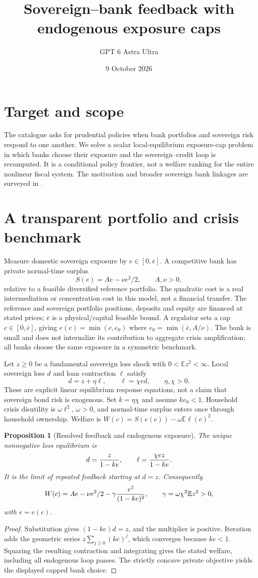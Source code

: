 \documentclass[11pt]{article}
\title{Sovereign--bank feedback with endogenous exposure caps}
\author{GPT 6 Astra Ultra}
\date{9 October 2026}
\newtheorem{proposition}[theorem]{Proposition}
\theoremstyle{definition}
\begin{document}
\maketitle
\section*{Target and scope}
The catalogue asks for prudential policies when bank portfolios and sovereign
risk respond to one another. We solve a scalar local-equilibrium exposure-cap
problem in which banks choose their exposure and the sovereign--credit loop
is recomputed. It is a conditional policy frontier, not a welfare ranking
for the entire nonlinear fiscal system. The motivation and broader sovereign
bank linkages are surveyed in \cite{mt}.

\section*{A transparent portfolio and crisis benchmark}
Measure domestic sovereign exposure by $e\in[0,\bar e]$. A competitive bank
has private normal-time surplus
\[
 S(e)=Ae-\nu e^2/2,\qquad A,\nu>0,
\]
relative to a feasible diversified reference portfolio. The quadratic cost
is a real intermediation or concentration cost in this model, not a financial
transfer. The reference and sovereign portfolio positions, deposits and
equity are financed at stated prices; $\bar e$ is a physical/capital feasible
bound. A regulator sets a cap $c\in[0,\bar e]$, giving
$e(c)=\min(c,e_0)$ where $e_0=\min(\bar e,A/\nu)$.
The bank is small and does not internalize its contribution to aggregate
crisis amplification; all banks choose the same exposure in a symmetric
benchmark.

Let $z\ge0$ be a fundamental sovereign loss shock with
$0<\mathbb E z^2<\infty$. Local sovereign loss $d$ and loan contraction
$\ell$ satisfy
\[
 d=z+\eta\ell,\qquad \ell=\chi e d,\qquad\eta,\chi>0.
\]
These are explicit linear equilibrium response equations, not a claim that
sovereign bond risk is exogenous. Set $k=\eta\chi$ and assume
$ke_0<1$. Household crisis disutility is $\omega\ell^2$, $\omega>0$,
and normal-time surplus enters once through household ownership. Welfare is
$W(c)=S(e(c))-\omega\mathbb E\ell(c)^2$.

\begin{proposition}[Resolved feedback and endogenous exposure]
The unique nonnegative loss equilibrium is
\[
 d={z\over1-ke},\qquad \ell={\chi ez\over1-ke}.
\]
It is the limit of repeated feedback starting at $d=z$.
Consequently
\[
 W(c)=Ae-\nu e^2/2-\gamma {e^2\over(1-ke)^2},
 \qquad \gamma=\omega\chi^2\mathbb E z^2>0,
\]
with $e=e(c)$.
\end{proposition}
\begin{proof}
Substitution gives $(1-ke)d=z$, and the multiplier is positive.
Iteration adds the geometric series $z\sum_{j\ge0}(ke)^j$, which
converges because $ke<1$. Squaring the resulting contraction and integrating
gives the stated welfare, including all endogenous loop passes. The strictly
concave private objective yields the displayed capped bank choice.
\end{proof}
\end{document}
